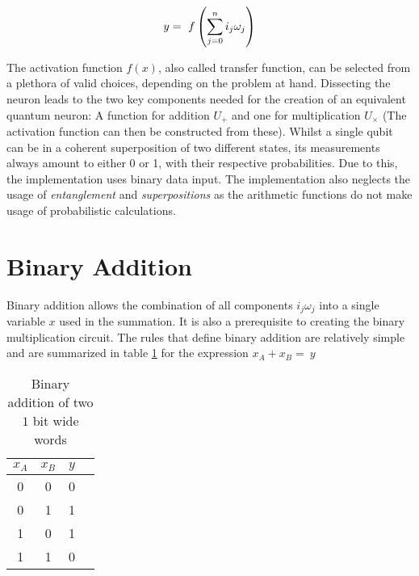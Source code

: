 \begin{equation}
    \centering
    y =\ f\left(\sum_{j = 0}^n i_j\omega_j\right)
    \label{equation:computation_neuron}
\end{equation}

\newpage

The activation function $f(x)$, also called transfer function, can be selected from a plethora of valid choices\cite{szandala_review_2021}, depending on the problem at hand. Dissecting the neuron leads to the two key components needed for the creation of an equivalent quantum neuron: A function for addition $U_{+}$ and one for multiplication $U_{\times}$ (The activation function can then be constructed from these). Whilst a single qubit can be in a coherent superposition of two different states\cite{nielsen_quantum_2010}, its measurements always amount to either 0 or 1, with their respective probabilities. Due to this, the implementation uses binary data input. The implementation also neglects the usage of \emph{entanglement} and \emph{superpositions} as the arithmetic functions do not make usage of probabilistic calculations.

\section{Binary Addition}\label{chapter:binary_addition}

Binary addition allows the combination of all components $i_j\omega_j$ into a single variable $x$ used in the summation. It is also a prerequisite to creating the binary multiplication circuit. The rules that define binary addition are relatively simple and are summarized in table \ref{table:binary_addition_rules} for the expression $x_A + x_B =\ y$\\
\begin{table}[!h]
\centering
\begin{tabular}{|c|c|c|c|}
\hline
$x_A$ & $x_B$ & $y$ \\ \hline
0    & 0    & 0  \\ \hline
0    & 1    & 1  \\ \hline
1    & 0    & 1  \\ \hline
1    & 1    & 0  \\ \hline
\end{tabular}
\caption{Binary addition of two $1$ bit wide words}
\label{table:binary_addition_rules}
\end{table}

